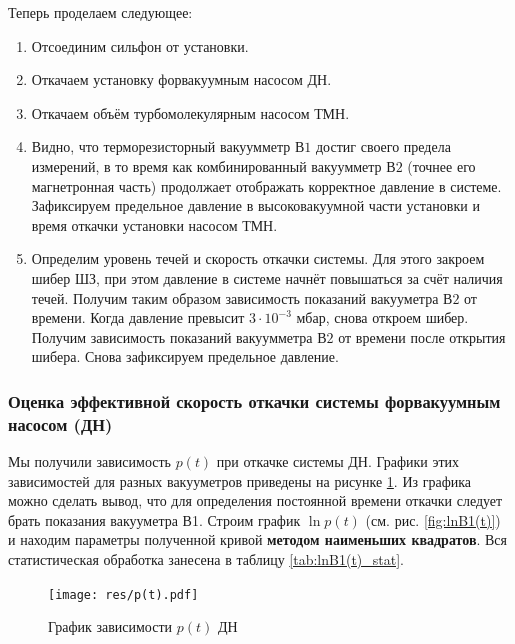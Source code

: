 \documentclass[12pt,a4paper]{article}
\begin{document}
	
	
	Теперь проделаем следующее:
	
	\begin{enumerate}
		\item Отсоединим сильфон от установки.
		\item Откачаем установку форвакуумным насосом ДН.
		\item Откачаем объём турбомолекулярным насосом ТМН.
		\item Видно, что терморезисторный вакуумметр $В1$ достиг своего предела измерений, в то время как комбинированный вакуумметр $В2$ (точнее его магнетронная часть) продолжает отображать корректное давление в системе. Зафиксируем предельное давление в высоковакуумной части установки и время откачки установки насосом ТМН.
		\item Определим уровень течей и скорость откачки системы. Для этого закроем шибер ШЗ, при этом давление в системе начнёт повышаться за счёт наличия течей. Получим таким образом зависимость показаний вакууметра $В2$ от времени. Когда давление превысит $3 \cdot 10^{-3}$ мбар,
		снова откроем шибер. Получим зависимость показаний вакуумметра $В2$ от времени после открытия шибера. Снова зафиксируем предельное давление.
	\end{enumerate}
	
	\subsubsection*{Оценка эффективной скорость откачки системы форвакуумным насосом (ДН)}
	Мы получили зависимость $p(t)$ при откачке системы ДН. Графики этих зависимостей для разных вакууметров приведены на рисунке \ref{fig:p(t)}. Из графика можно сделать вывод, что для определения постоянной времени откачки следует брать показания вакууметра В1. Строим график $\ln{p}(t)$ (см. рис. \ref{fig:lnB1(t)}) и находим параметры полученной кривой \textbf{методом наименьших квадратов}. Вся статистическая обработка занесена в таблицу \ref{tab:lnB1(t)_stat}.
	
	
	\begin{figure}[h]
		\centering
		\texttt{[image: res/p(t).pdf]}
		\caption{График зависимости $p(t)$ ДН}
		\label{fig:p(t)}
	\end{figure}
	
\end{document}
